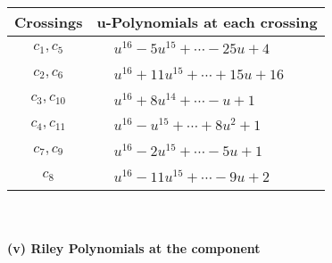 \documentclass[1p]{elsarticle_modified}
\theoremstyle{definition}
\begin{document}
\begin{tabular}{m{50pt}|m{274pt}}
Crossings & \hspace{64pt}u-Polynomials at each crossing \\
\hline $$\begin{aligned}c_{1},c_{5}\end{aligned}$$&$\begin{aligned}
&u^{16}-5 u^{15}+\cdots-25 u+4
\end{aligned}$\\
\hline $$\begin{aligned}c_{2},c_{6}\end{aligned}$$&$\begin{aligned}
&u^{16}+11 u^{15}+\cdots+15 u+16
\end{aligned}$\\
\hline $$\begin{aligned}c_{3},c_{10}\end{aligned}$$&$\begin{aligned}
&u^{16}+8 u^{14}+\cdots- u+1
\end{aligned}$\\
\hline $$\begin{aligned}c_{4},c_{11}\end{aligned}$$&$\begin{aligned}
&u^{16}- u^{15}+\cdots+8 u^2+1
\end{aligned}$\\
\hline $$\begin{aligned}c_{7},c_{9}\end{aligned}$$&$\begin{aligned}
&u^{16}-2 u^{15}+\cdots-5 u+1
\end{aligned}$\\
\hline $$\begin{aligned}c_{8}\end{aligned}$$&$\begin{aligned}
&u^{16}-11 u^{15}+\cdots-9 u+2
\end{aligned}$\\
\hline
\end{tabular}\\~\\
\newpage\renewcommand{\arraystretch}{1}
\flushleft \textbf{(v) Riley Polynomials at the component}\newline \\
\end{document}
